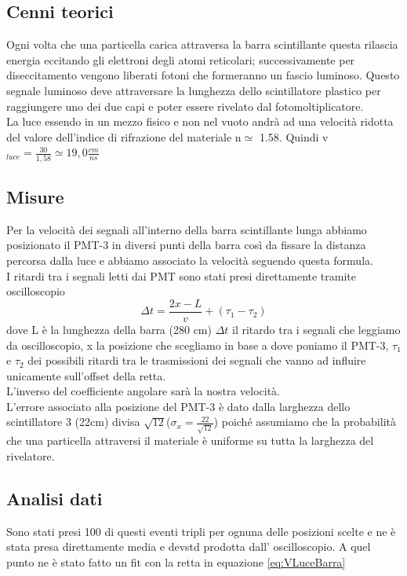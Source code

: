 \documentclass[a4paper]{article}
\begin{document}
\subsection{Cenni teorici}
Ogni volta che una particella carica attraversa la barra scintillante questa rilascia energia eccitando gli elettroni degli atomi reticolari; successivamente per diseccitamento vengono liberati fotoni che formeranno un fascio luminoso. Questo segnale luminoso deve attraversare la lunghezza dello scintillatore plastico per raggiungere uno dei due capi e poter essere rivelato dal fotomoltiplicatore.\\
La luce essendo in un mezzo fisico e non nel vuoto andrà ad una velocità ridotta del valore dell'indice di rifrazione del materiale n$\simeq$ 1.58. Quindi v$_{luce} = \frac{30}{1,58} \simeq 19,0 \frac{cm}{ns}$

\subsection{Misure}
Per la velocità dei segnali all'interno della barra scintillante lunga abbiamo posizionato il PMT-3 in diversi punti della barra così da fissare la distanza percorsa dalla luce e abbiamo associato la velocità seguendo questa formula.\\
I ritardi tra i segnali letti dai PMT sono stati presi direttamente tramite oscilloscopio
\begin{equation}
\Delta t = \frac{2x-L}{v} + (\tau_1 - \tau_2)
\label{eq:VLuceBarra}
\end{equation}
dove L è la lunghezza della barra (280 cm) $\Delta t$ il ritardo tra i segnali che leggiamo da oscilloscopio, x la posizione che scegliamo in base a dove poniamo il PMT-3, $\tau_1$ e $\tau_2$ dei possibili ritardi tra le trasmissioni dei segnali che vanno ad influire unicamente sull'offset della retta.\\
L'inverso del coefficiente angolare sarà la nostra velocità.\\
L'errore associato alla posizione del PMT-3 è dato dalla larghezza dello scintillatore 3 (22cm) divisa $\sqrt{12}$($\sigma _x = \frac{22}{\sqrt{12}}$) poiché assumiamo che la probabilità che una particella attraversi il materiale è uniforme su tutta la larghezza del rivelatore.


\subsection{Analisi dati}
Sono stati presi 100 di questi eventi tripli per ognuna delle posizioni scelte e ne è stata presa direttamente media e devstd prodotta dall' oscilloscopio. A quel punto ne è stato fatto un fit con la retta in equazione \ref{eq:VLuceBarra}
\end{document}
